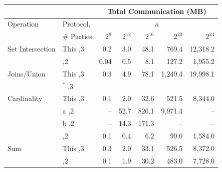 \begin{figure*}[t!]\centering\footnotesize
	\begin{tabular}{|l |l|| r | r |r |r|r|}
		\cline{3-7}
		\multicolumn{1}{c}{}              & \multicolumn{1}{c}{}                            & \multicolumn{5}{|c|}{Total Communication (MB)}    \\ \hline
		\multirow{2}{*}{Operation}        & \multirow{1}{*}{Protocol,}                      &             \multicolumn{5}{c|}{$n$}              \\
		                                  & \# Parties                                      & $2^8$ & $2^{12}$ & $2^{16}$ & $2^{20}$ & $2^{24}$ \\ \hline\hline
		\multirow{2}{*}{Set Intersection} & This                         \hfill ,3          & 0.2   & 3.0      & 48.1     & 769.4    & 12,318.2 \\ \cline{2-7}
		                                  & \cite{CCS:KKRT16}                     \hfill ,2 & 0.04  & 0.5      & 8.1      & 127.2    &  1,955.2 \\ \hline\hline
		\multirow{2}{*}{Joins/Union}      & This                        \hfill ,3           & 0.3   & 4.9      & 78.1     & 1,249.4  & 19,998.1 \\ \cline{2-7}
		                                  & \cite{LTW13}$^*$                      \hfill ,3 &       &          &          &          &          \\ \hline\hline
		\multirow{3}{*}{Cardinality}      & This                          \hfill ,3         & 0.1   & 2.0      & 32.6     & 521.5    &  8,344.0 \\ \cline{2-7}
		                                  & \cite{PSWW18}a                   \hfill ,2      & --    & 52.7     & 826.1    & 9,971.4  &       -- \\ \cline{2-7}
		                                  & \cite{PSWW18}b                   \hfill ,2      & --    & 14.3     & 171.3    & --       &       -- \\ \cline{2-7}
		                                  & \cite{DBLP:conf/cans/CristofaroGT12} \hfill ,2  & 0.1   & 0.4      & 6.2      & 99.0     &  1,584.0 \\ \hline\hline
		\multirow{2}{*}{Sum}              & This                           \hfill ,3        & 0.3   & 2.0      & 33.1     & 526.5    &  8,372.0 \\ \cline{2-7}
		                                  & \cite{cryptoeprint:2017:738}    \hfill ,2       & 0.1   & 1.9      & 30.2     & 483.0    &  7,728.0 \\ \hline\hline

\end{tabular}
\end{figure*}
